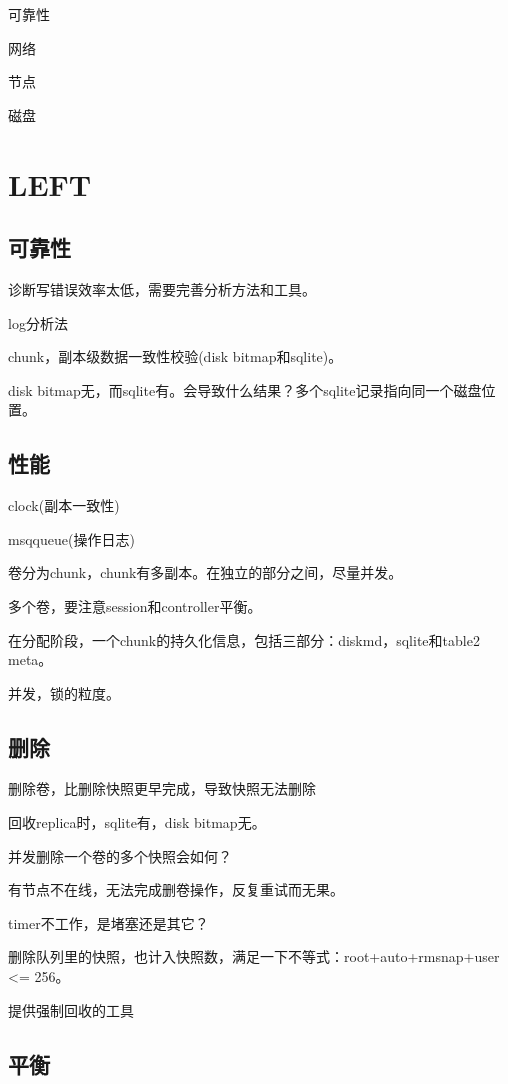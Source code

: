 可靠性
\begin{enumbox}
\item 网络
\item 节点
\item 磁盘
\end{enumbox}

\section{LEFT}

\subsection{可靠性}

诊断写错误效率太低，需要完善分析方法和工具。

log分析法

chunk，副本级数据一致性校验(disk bitmap和sqlite)。

disk bitmap无，而sqlite有。会导致什么结果？多个sqlite记录指向同一个磁盘位置。

\subsection{性能}

clock(副本一致性)

msqqueue(操作日志)

卷分为chunk，chunk有多副本。在独立的部分之间，尽量并发。

多个卷，要注意session和controller平衡。

在分配阶段，一个chunk的持久化信息，包括三部分：diskmd，sqlite和table2 meta。

并发，锁的粒度。

\subsection{删除}

删除卷，比删除快照更早完成，导致快照无法删除

回收replica时，sqlite有，disk bitmap无。

并发删除一个卷的多个快照会如何？

有节点不在线，无法完成删卷操作，反复重试而无果。

timer不工作，是堵塞还是其它？

删除队列里的快照，也计入快照数，满足一下不等式：root+auto+rmsnap+user <= 256。

提供强制回收的工具

\subsection{平衡}

